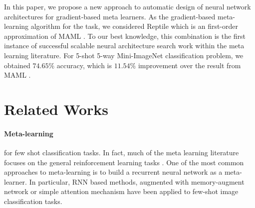 \documentclass{article}
\begin{document}
In this paper, we propose a new approach to automatic design of neural network architectures for gradient-based meta learners. 
As the gradient-based meta-learning algorithm for the task, we considered Reptile \cite{nichol:reptile:DBLP:journals/corr/abs-1803-02999} which is an first-order approximation of MAML \cite{finn:maml:DBLP:conf/icml/FinnAL17}. To our best knowledge, this combination is the first instance of successful
scalable neural architecture search work within the meta learning literature. For 5-shot 5-way Mini-ImageNet classification problem, we obtained $74.65\%$ accuracy, which is $11.54\%$ improvement over the result from MAML \cite{finn:maml:DBLP:conf/icml/FinnAL17}.


\section{Related Works}\paragraph{Meta-learning}%
for few shot classification tasks. In fact, much of the meta learning literature focuses on the general reinforcement
learning tasks \cite{DBLP:journals/corr/DuanSCBSA16:fast_rl, DBLP:journals/corr/WangKTSLMBKB16:learn_to_rl}.
One of the most common approaches to meta-learning is to build a recurrent neural network as a meta-learner. 
In particular, RNN based methods, augmented with
memory-augment network \cite{santoro:memoty_meta:DBLP:conf/icml/SantoroBBWL16} or simple attention mechanism \cite{mishra:attentive_meta:DBLP:journals/corr/MishraRCA17} have been
applied to few-shot image classification tasks. 
\end{document}
